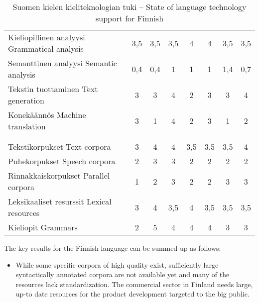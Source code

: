 \documentclass[]{../../metanetpaper}
\begin{document}
\begin{multicols}{2}
\begin{table}
\begin{tabular}{>{\columncolor[RGB]{255,190,000}}p{.33\linewidth}ccccccc}
 Kieliopillinen analyysi \newline Grammatical analysis
                                     & 3,5 & 3,5 & 3,5 & 4 & 4 & 3,5 & 3,5\\
 Semanttinen analyysi \newline Semantic analysis
                                     & 0,4 & 0,4 & 1 & 1 & 1 & 1,4 & 0,7 \\
 Tekstin tuottaminen \newline Text generation & 3 & 3 & 4 & 2 & 3 & 3 & 4 \\
 Konekäännös \newline Machine translation & 3 & 1 & 4 & 2 & 3 & 1 & 2 \\
 \midrule
 \multicolumn{8}{>{\columncolor[RGB]{255,155,000}}l}{Kieliaineistot:
aineistot, tietokannat ja tietämyskannat} \\\addlinespace[{-.009cm}]
 \multicolumn{8}{>{\columncolor[RGB]{255,155,000}}l}{Language Resources:
Resources, Data and Knowledge Bases} \\
 \midrule
 Tekstikorpukset \newline Text corpora & 3 & 4 & 4 & 3,5 & 3,5 & 3,5 & 4 \\
 Puhekorpukset \newline Speech corpora & 2 & 3 & 3 & 2 & 2 & 2 & 2 \\
 Rinnakkaiskorpukset \newline Parallel corpora
                                       & 1 & 2 & 3 & 2 & 2 & 3 & 3 \\
 Leksikaaliset resurssit \newline Lexical resources
                                & 3 & 4 & 3,5 & 4 & 3,5 & 3,5 & 3,5 \\
 Kieliopit \newline Grammars & 2 & 5 & 4 & 4 & 4 & 3 & 3 \\
 \bottomrule
 \end{tabular}
 \label{tab:finnish_table}
 \caption{Suomen kielen kieliteknologian tuki -- State of
language technology support for Finnish}
 \end{table}


The key results for the Finnish language can be summed up as follows:
\begin{itemize}
\item While some specific corpora of high quality exist, sufficiently large
    syntactically annotated corpora are not available yet and many of the
    resources lack standardization. The commercial sector in Finland needs
    large, up-to date resources for the product development targeted to the big
    public.


\end{itemize}
\end{multicols}
\end{document}
